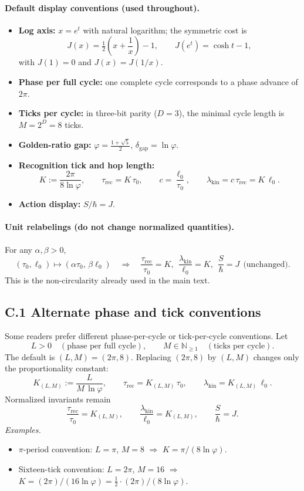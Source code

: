 \documentclass[11pt]{article}
\begin{document}
\paragraph{Default display conventions (used throughout).}
\begin{itemize}
  \item \textbf{Log axis:} \(x=e^{t}\) with natural logarithm; the symmetric cost is
  \[
  J(x)=\tfrac12\!\left(x+\frac{1}{x}\right)-1,\qquad J(e^{t})=\cosh t-1,
  \]
  with \(J(1)=0\) and \(J(x)=J(1/x)\).
  \item \textbf{Phase per full cycle:} one complete cycle corresponds to a phase advance of \(2\pi\).
  \item \textbf{Ticks per cycle:} in three-bit parity (\(D=3\)), the minimal cycle length is \(M=2^{D}=8\) ticks.
  \item \textbf{Golden-ratio gap:} \(\varphi=\tfrac{1+\sqrt5}{2}\), \(\delta_{\mathrm{gap}}=\ln\varphi\).
  \item \textbf{Recognition tick and hop length:}
  \[
  K:=\frac{2\pi}{8\ln\varphi},\qquad
  \tau_{\mathrm{rec}}=K\,\tau_{0},\qquad
  c=\frac{\ell_{0}}{\tau_{0}},\qquad
  \lambda_{\mathrm{kin}}=c\,\tau_{\mathrm{rec}}=K\,\ell_{0}.
  \]
  \item \textbf{Action display:} \(S/\hbar=J\).
\end{itemize}

\paragraph{Unit relabelings (do not change normalized quantities).}
For any \(\alpha,\beta>0\),
\[
(\tau_{0},\ell_{0})\mapsto(\alpha\tau_{0},\,\beta\ell_{0})\quad\Rightarrow\quad
\frac{\tau_{\mathrm{rec}}}{\tau_{0}}=K,\ \ \frac{\lambda_{\mathrm{kin}}}{\ell_{0}}=K,\ \ \frac{S}{\hbar}=J
\ \ \text{(unchanged)}.
\]
This is the non-circularity already used in the main text.

\subsection*{C.1 Alternate phase and tick conventions}
Some readers prefer different phase-per-cycle or tick-per-cycle conventions. Let
\[
L>0\quad(\text{phase per full cycle}),\qquad M\in\mathbb{N}_{\ge 1}\quad(\text{ticks per cycle}).
\]
The default is \((L,M)=(2\pi,8)\). Replacing \((2\pi,8)\) by \((L,M)\) changes only the proportionality constant:
\[
K_{(L,M)}:=\frac{L}{M\,\ln\varphi},\qquad
\tau_{\mathrm{rec}}=K_{(L,M)}\,\tau_{0},\qquad
\lambda_{\mathrm{kin}}=K_{(L,M)}\,\ell_{0}.
\]
Normalized invariants remain
\[
\frac{\tau_{\mathrm{rec}}}{\tau_{0}}=K_{(L,M)},\qquad
\frac{\lambda_{\mathrm{kin}}}{\ell_{0}}=K_{(L,M)},\qquad
\frac{S}{\hbar}=J.
\]
\emph{Examples.}
\begin{itemize}
  \item \(\pi\)-period convention: \(L=\pi\), \(M=8\) \(\Rightarrow\) \(K=\pi/(8\ln\varphi)\).
  \item Sixteen-tick convention: \(L=2\pi\), \(M=16\) \(\Rightarrow\) \(K=(2\pi)/(16\ln\varphi)=\tfrac12\cdot (2\pi)/(8\ln\varphi)\).
\end{itemize}
\end{document}
